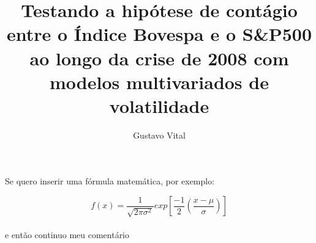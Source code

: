 \documentclass[final]{resenha}
\author{Gustavo Vital}
\title{Testando a hipótese de contágio entre o Índice Bovespa e o S\&P500 ao longo da crise de 2008 com modelos multivariados de volatilidade}
\begin{document}
\maketitle

\begin{present}
\lipsum[3]
\end{present}

\lipsum[4]

\begin{coment}
\lipsum[1]

Se quero inserir uma fórmula matemática, por exemplo:

$$f(x)=\frac{1}{\sqrt{2\pi\sigma^2}}exp\left[\frac{-1}{2}\left(\frac{x-\mu}{\sigma}\right)\right]$$\\
e então continuo meu comentário
\end{coment}

\lipsum[2]
\end{document}
